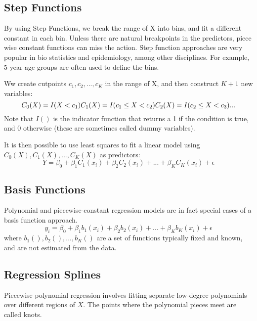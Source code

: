 \documentclass[
]{article}
\begin{document}
\hypertarget{step-functions}{%
\subsection{Step Functions}\label{step-functions}}

By using Step Functions, we break the range of X into bins, and fit a
different constant in each bin. Unless there are natural breakpoints in
the predictors, piece wise constant functions can miss the action. Step
function approaches are very popular in bio statistics and epidemiology,
among other disciplines. For example, 5-year age groups are often used
to define the bins.

Ww create cutpoints \(c_1, c_2, ..., c_K\) in the range of X, and then
construct \(K + 1\) new variables: \[
C_0(X) = I(X < c_1) \\
C_1(X) = I(c_1 \leq X < c_2) \\
C_2(X) = I(c_2 \leq X < c_3) \\
... \\
\] Note that \(I()\) is the indicator function that returns a 1 if the
condition is true, and 0 otherwise (these are sometimes called dummy
variables).

It is then possible to use least squares to fit a linear model using
\(C_0(X), C_1(X), ..., C_K(X)\) as predictors: \[
Y = \beta_0 + \beta_1C_1(x_i) + \beta_2C_2(x_i) + ... + \beta_KC_K(x_i) + \epsilon
\]

\hypertarget{basis-functions}{%
\subsection{Basis Functions}\label{basis-functions}}

Polynomial and piecewise-constant regression models are in fact special
cases of a basis function approach. \[
y_i = \beta_0 + \beta_1b_1(x_i) + \beta_2b_2(x_i) + ... + \beta_Kb_K(x_i) + \epsilon
\] where \(b_1(), b_2(), ..., b_K()\) are a set of functions typically
fixed and known, and are not estimated from the data.

\hypertarget{regression-splines}{%
\subsection{Regression Splines}\label{regression-splines}}

Piecewise polynomial regression involves fitting separate low-degree
polynomials over different regions of \(X\). The points where the
polynomial pieces meet are called knots.
\end{document}
